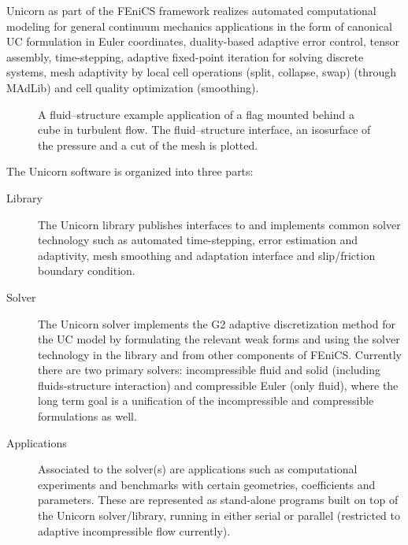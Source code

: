 Unicorn as part of the FEniCS framework realizes automated computational
modeling for general continuum mechanics applications in the form of
canonical UC formulation in Euler coordinates, duality-based adaptive
error control, tensor assembly, time-stepping, adaptive fixed-point
iteration for solving discrete systems, mesh adaptivity by local cell
operations (split, collapse, swap) (through MAdLib) and cell quality
optimization (smoothing).


\begin{figure}
\caption{A fluid--structure example application of a flag mounted behind
a cube in turbulent flow. The fluid--structure interface, an isosurface
of the pressure and a cut of the mesh is plotted.}
\label{fig:flag3D}
\end{figure}

The Unicorn software is organized into three parts:
\begin{description}
\item[Library]
The Unicorn library publishes interfaces to and implements common
solver technology such as automated time-stepping, error
estimation and adaptivity, mesh smoothing and adaptation interface and
slip/friction boundary condition.

\item[Solver]
The Unicorn solver implements the G2 adaptive discretization method
for the UC model by formulating the relevant weak forms and using the
solver technology in the library and from other components of
FEniCS. Currently there are two primary solvers: incompressible
fluid and solid (including fluids-structure interaction) and compressible
Euler (only fluid), where the long term goal is a unification of the
incompressible and compressible formulations as well.

\item[Applications]
Associated to the solver(s) are applications such as computational
experiments and benchmarks with certain geometries, coefficients and
parameters. These are represented as stand-alone programs built on top
of the Unicorn solver/library, running in either serial or parallel
(restricted to adaptive incompressible flow currently).
\end{description}

